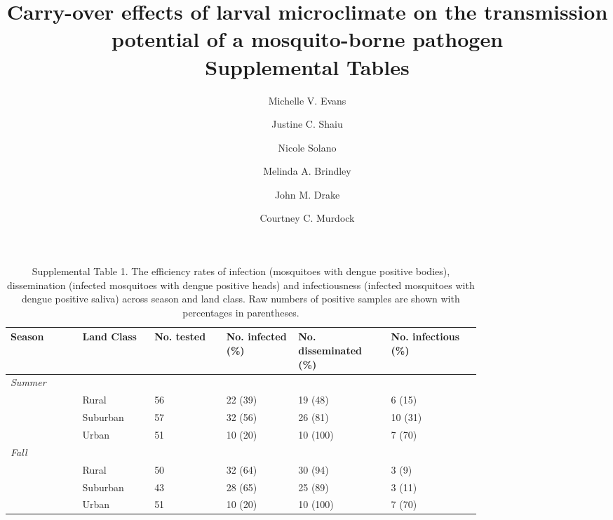 \documentclass[12pt]{article}
\begin{document}
\title{Carry-over effects of larval microclimate on the transmission potential of a mosquito-borne pathogen\\
\large Supplemental Tables}
\author{
		Michelle V. Evans\\
		\and
		Justine C. Shaiu\\
		\and
		Nicole Solano\\
		\and
		Melinda A. Brindley\\
		\and
		John M. Drake\\
    \and
    Courtney C. Murdock
		}
\date{}
\maketitle

\newpage

\begin{landscape}

\begin{table}[h]
\centering
\begin{tabular}{P{0.12\linewidth}P{0.12\linewidth}P{0.12\linewidth}P{0.12\linewidth}P{0.15\linewidth}P{0.15\linewidth}}
\hline
\textbf{Season} & \textbf{Land Class} & \textbf{No. tested} & \textbf{No. infected (\%)}  & \textbf{No. disseminated (\%)} & \textbf{No. infectious (\%)} \\
\hline
\hline
\textit{Summer} &   &   &   &   \\
     & Rural & 56 & 22 (39) & 19 (48) & 6 (15) \\
   & Suburban & 57 & 32 (56) & 26 (81) & 10 (31) \\
   & Urban & 51 & 10 (20) & 10 (100) & 7 (70) \\

\textit{Fall} &   &   &   &   \\
     & Rural & 50 & 32 (64) & 30 (94) & 3 (9) \\
   & Suburban & 43 & 28 (65) & 25 (89) & 3 (11) \\
   & Urban & 51 & 10 (20) & 10 (100) & 7 (70) \\
\hline
\end{tabular}
\caption{Supplemental Table 1. The efficiency rates of infection (mosquitoes with dengue positive bodies), dissemination (infected mosquitoes with dengue positive heads) and infectiousness (infected mosquitoes with dengue positive saliva) across season and land class. Raw numbers of positive samples are shown with percentages in parentheses.}
\end{table}
\end{landscape}
\end{document}
